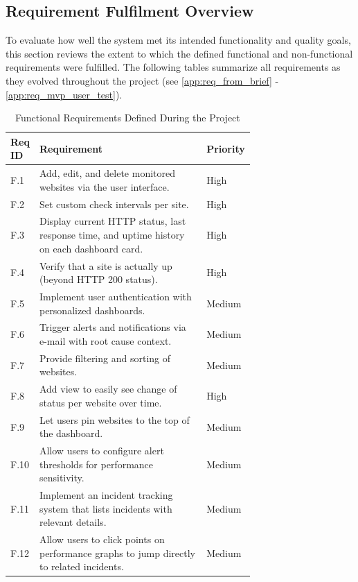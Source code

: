 \subsection{Requirement Fulfilment Overview}
\label{subsec:req_final}

To evaluate how well the system met its intended functionality and quality goals, this section reviews the extent to which the defined functional and non-functional requirements were fulfilled. The following tables summarize all requirements as they evolved throughout the project (see \autoref{app:req_from_brief} - \autoref{app:req_mvp_user_test}).


\begin{table}[H]
\centering
\begin{tabular}{|l|p{0.7\linewidth}|l|}
\hline
\textbf{Req ID} & \textbf{Requirement} & \textbf{Priority} \\ \hline
F.1  & Add, edit, and delete monitored websites via the user interface. & High \\ \hline
F.2  & Set custom check intervals per site. & High \\ \hline
F.3  & Display current HTTP status, last response time, and uptime history on each dashboard card. & High \\ \hline
F.4  & Verify that a site is actually up (beyond HTTP 200 status). & High \\ \hline
F.5  & Implement user authentication with personalized dashboards. & Medium \\ \hline
F.6  & Trigger alerts and notifications via e-mail with root cause context. & Medium \\ \hline
F.7  & Provide filtering and sorting of websites. & Medium \\ \hline
F.8  & Add view to easily see change of status per website over time. & High \\ \hline
F.9  & Let users pin websites to the top of the dashboard. & Medium \\ \hline
F.10 & Allow users to configure alert thresholds for performance sensitivity. & Medium \\ \hline
F.11 & Implement an incident tracking system that lists incidents with relevant details. & Medium \\ \hline
F.12 & Allow users to click points on performance graphs to jump directly to related incidents. & Medium \\ \hline
\end{tabular}
\caption{Functional Requirements Defined During the Project}
\label{tab:functional_requirements_full}
\end{table}

